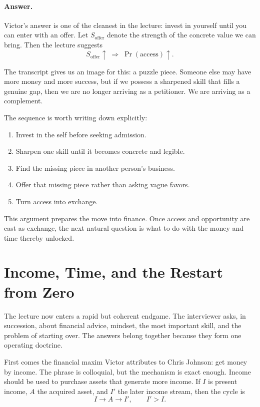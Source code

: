 \paragraph{Answer.}
Victor's answer is one of the cleanest in the lecture: invest in yourself until you can enter with an offer. Let \(S_{\text{offer}}\) denote the strength of the concrete value we can bring. Then the lecture suggests
\begin{equation}
S_{\text{offer}} \uparrow \;\Rightarrow\; \Pr(\text{access}) \uparrow.
\end{equation}

The transcript gives us an image for this: a puzzle piece. Someone else may have more money and more success, but if we possess a sharpened skill that fills a genuine gap, then we are no longer arriving as a petitioner. We are arriving as a complement.

The sequence is worth writing down explicitly:
\begin{enumerate}
\item Invest in the self before seeking admission.
\item Sharpen one skill until it becomes concrete and legible.
\item Find the missing piece in another person's business.
\item Offer that missing piece rather than asking vague favors.
\item Turn access into exchange.
\end{enumerate}

This argument prepares the move into finance. Once access and opportunity are cast as exchange, the next natural question is what to do with the money and time thereby unlocked.

\section{Income, Time, and the Restart from Zero}

The lecture now enters a rapid but coherent endgame. The interviewer asks, in succession, about financial advice, mindset, the most important skill, and the problem of starting over. The answers belong together because they form one operating doctrine.

First comes the financial maxim Victor attributes to Chris Johnson: get money by income. The phrase is colloquial, but the mechanism is exact enough. Income should be used to purchase assets that generate more income. If \(I\) is present income, \(A\) the acquired asset, and \(I'\) the later income stream, then the cycle is
\begin{equation}
I \to A \to I', \qquad I' > I.
\end{equation}

